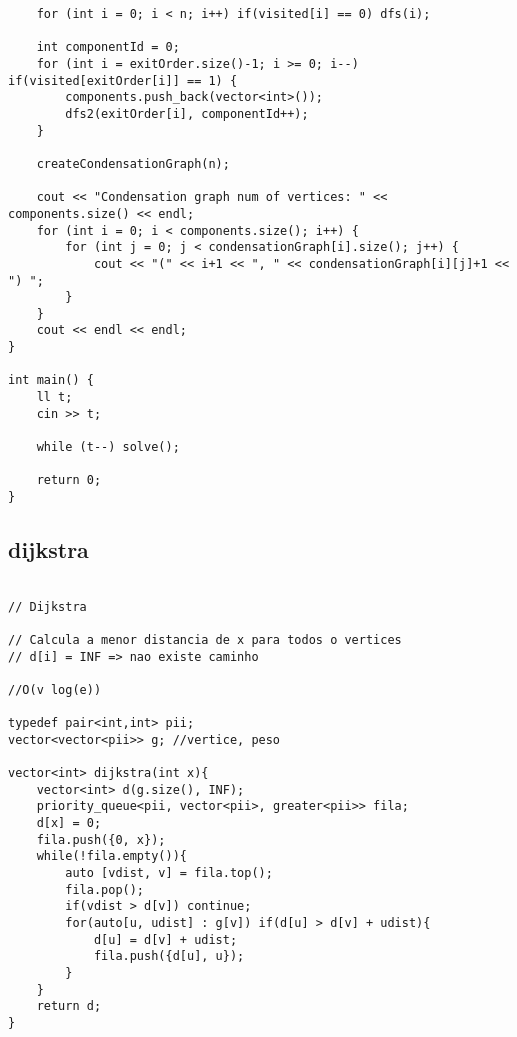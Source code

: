 \documentclass[landscape,twocolumn,10pt,a4paper]{article}
\begin{document}
\begin{verbatim}
    for (int i = 0; i < n; i++) if(visited[i] == 0) dfs(i);

    int componentId = 0;
    for (int i = exitOrder.size()-1; i >= 0; i--) if(visited[exitOrder[i]] == 1) {
        components.push_back(vector<int>());
        dfs2(exitOrder[i], componentId++);
    }

    createCondensationGraph(n);

    cout << "Condensation graph num of vertices: " << components.size() << endl;
    for (int i = 0; i < components.size(); i++) {
        for (int j = 0; j < condensationGraph[i].size(); j++) {
            cout << "(" << i+1 << ", " << condensationGraph[i][j]+1 << ") ";
        }
    }
    cout << endl << endl;
}

int main() {
    ll t;
    cin >> t;

    while (t--) solve();

    return 0;
}\end{verbatim}

\subsection{dijkstra}
\begin{verbatim}

// Dijkstra

// Calcula a menor distancia de x para todos o vertices
// d[i] = INF => nao existe caminho

//O(v log(e))

typedef pair<int,int> pii;
vector<vector<pii>> g; //vertice, peso

vector<int> dijkstra(int x){
    vector<int> d(g.size(), INF);
    priority_queue<pii, vector<pii>, greater<pii>> fila;
    d[x] = 0;
    fila.push({0, x});
    while(!fila.empty()){
        auto [vdist, v] = fila.top();
        fila.pop();
        if(vdist > d[v]) continue;
        for(auto[u, udist] : g[v]) if(d[u] > d[v] + udist){
            d[u] = d[v] + udist;
            fila.push({d[u], u});
        }
    }
    return d;
}
\end{verbatim}
\end{document}
